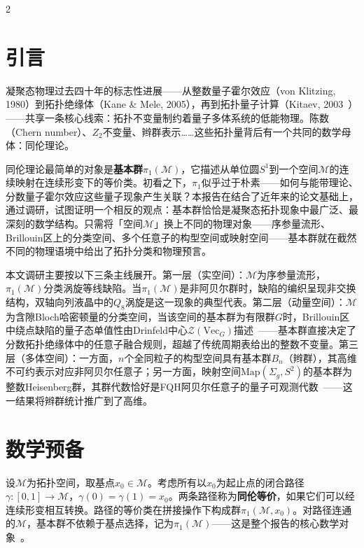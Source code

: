 \documentclass[a4paper,11pt]{ctexart}
\begin{document}
\vspace{0.5cm}
\begin{multicols}{2}

\section{引言}

凝聚态物理过去四十年的标志性进展——从整数量子霍尔效应（von Klitzing, 1980）到拓扑绝缘体（Kane \& Mele, 2005），再到拓扑量子计算（Kitaev, 2003~\cite{Kitaev2006}）——共享一条核心线索：拓扑不变量制约着量子多体系统的低能物理。陈数（Chern number）、$Z_2$不变量、辫群表示……这些拓扑量背后有一个共同的数学母体：同伦理论。

同伦理论最简单的对象是\textbf{基本群}$\pi_1(\mathcal{M})$，它描述从单位圆$S^1$到一个空间$\mathcal{M}$的连续映射在连续形变下的等价类。初看之下，$\pi_1$似乎过于朴素——如何与能带理论、分数量子霍尔效应这些量子现象产生关联？本报告在结合了近年来的论文基础上，通过调研，试图证明一个相反的观点：基本群恰恰是凝聚态拓扑现象中最广泛、最深刻的数学结构。只需将「空间$\mathcal{M}$」换上不同的物理对象——序参量流形、Brillouin区上的分类空间、多个任意子的构型空间或映射空间——基本群就在截然不同的物理语境中给出了拓扑分类和物理预言。

本文调研主要按以下三条主线展开。第一层（实空间）：$\mathcal{M}$为序参量流形，$\pi_1(\mathcal{M})$分类涡旋等线缺陷。当$\pi_1(\mathcal{M})$是非阿贝尔群时，缺陷的编织呈现非交换结构，双轴向列液晶中的$Q_8$涡旋是这一现象的典型代表。第二层（动量空间）：$\mathcal{M}$为含隙Bloch哈密顿量的分类空间，当该空间的基本群为有限群$G$时，Brillouin区中绕点缺陷的量子态单值性由Drinfeld中心$\mathcal{Z}(\mathrm{Vec}_G)$描述~\cite{Sati2026Drinfeld}——基本群直接决定了分数拓扑绝缘体中的任意子融合规则，超越了传统周期表给出的整数不变量。第三层（多体空间）：一方面，$n$个全同粒子的构型空间具有基本群$B_n$（辫群），其高维不可约表示对应非阿贝尔任意子；另一方面，映射空间$\mathrm{Map}(\Sigma_g,S^2)$的基本群为整数Heisenberg群，其群代数恰好是FQH阿贝尔任意子的量子可观测代数~\cite{Kallel2026Anyons}——这一结果将辫群统计推广到了高维。

\section{数学预备}

设$\mathcal{M}$为拓扑空间，取基点$x_0\in\mathcal{M}$。考虑所有以$x_0$为起止点的闭合路径$\gamma:[0,1]\to\mathcal{M}$，$\gamma(0)=\gamma(1)=x_0$。两条路径称为\textbf{同伦等价}，如果它们可以经连续形变相互转换。路径的等价类在拼接操作下构成群$\pi_1(\mathcal{M},x_0)$。对路径连通的$\mathcal{M}$，基本群不依赖于基点选择，记为$\pi_1(\mathcal{M})$——这是整个报告的核心数学对象~\cite{Nakahara2003}。


\end{multicols}
\end{document}
